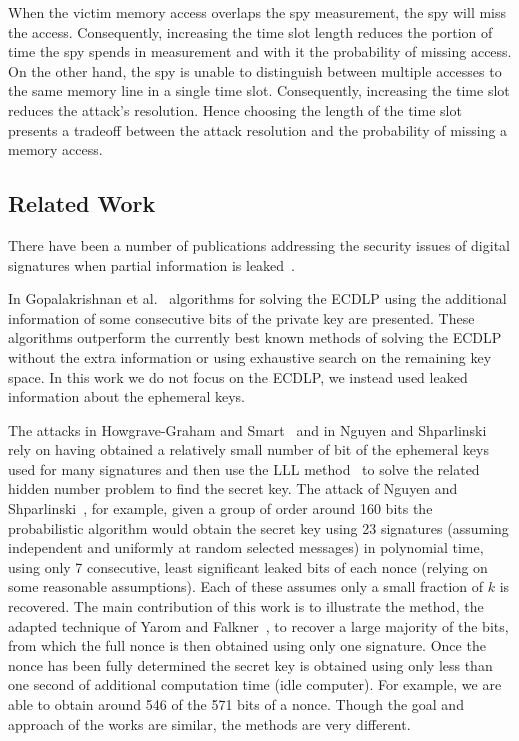 \documentclass[twocolumn]{svjour3}
\begin{document}
When the victim memory access overlaps the spy measurement, the spy will miss the access.
Consequently, increasing the time slot length reduces the portion of time the spy spends in
measurement and with it the probability of missing access.
On the other hand, the spy is unable to distinguish between multiple accesses to the same memory line in 
a single time slot.
Consequently, increasing the time slot reduces the attack's resolution.
Hence choosing the length of the time slot presents a tradeoff between the attack resolution
and the probability of missing a memory access.


\subsection{Related Work}\label{sec:related}
There have been a number of publications addressing the security issues of digital signatures when partial information is leaked~\cite{Howgrave-GrahamS01,gopalakrishnan07solving,nguyen03insecurity}. 

In Gopalakrishnan et al.~\cite{gopalakrishnan07solving} algorithms for solving the ECDLP using the additional information of some consecutive bits of the private key are presented. These algorithms outperform the currently best known methods of solving the ECDLP without the extra information or using exhaustive search on the remaining key space. In this work we do not focus on the ECDLP, we instead used leaked information about the ephemeral keys. 

The attacks in Howgrave-Graham and Smart~\cite{Howgrave-GrahamS01} and in Nguyen and Shparlinski~\cite{nguyen03insecurity} 
rely on having obtained a relatively small number of bit of the ephemeral keys used for many signatures and then use the LLL method~\cite{LLL} to solve the related hidden number problem to find the secret key.
 The attack of Nguyen and Shparlinski~\cite{nguyen03insecurity}, for example, given a group of order around 160 bits the probabilistic algorithm would obtain the secret key using 23 signatures (assuming independent and uniformly at random selected messages) in polynomial time, using only 7 consecutive, least significant leaked bits of each nonce (relying on some reasonable assumptions). Each of these assumes only a small fraction of $k$ is recovered. The main contribution of this work is to illustrate the method, the adapted technique of Yarom and Falkner~\cite{yarom13flush}, to recover a large majority of the bits, from which the full nonce is then obtained using only one signature. Once the nonce has been fully determined the secret key is obtained using only less than one second of additional computation time (idle computer). 
For example, we are able to obtain around 546 of the 571 bits of a nonce. Though the goal and approach of the works are similar, the methods are very different.
\end{document}

